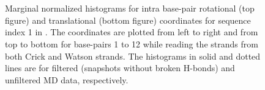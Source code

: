\begin{figure}
\begin{center}
\\
 \\
\end{center}
\caption{Marginal normalized histograms for intra base-pair rotational (top figure) and translational (bottom figure) coordinates for sequence index 1 in \Lbdna.
The coordinates are plotted from left to right and from top to bottom for base-pairs 1 to 12 while reading the strands from both Crick and Watson strands. 
The histograms in solid and dotted lines are for filtered (snapshots without broken H-bonds) and unfiltered MD data, respectively.
}
\label{c3:fig_hist_filter1}
\end{figure} \clearpage

